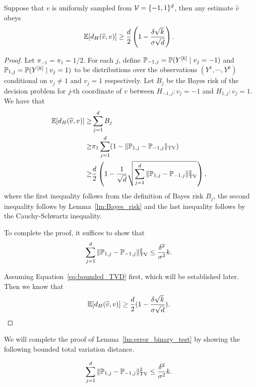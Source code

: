 \begin{lemma}
\label{lm:error_binary_test}
Suppose that $v$ is uniformly sampled from $\mathcal V=\{-1,1\}^d$, then any estimate $\hat{v}$
obeys
\begin{align*}
    \operatorname*{\mathbb{E}}[d_H(\widehat{v},v)]\geq
    \frac{d}{2}\left( 1-\frac{\delta\sqrt{k}}{\sigma\sqrt{d}}\right).
\end{align*}
\end{lemma}

\begin{proof}
Let $\pi_{-1}=\pi_1=1/2$.
For each $j$, define $\mathbb{P}_{-1,j}=\mathbb P(Y^{[k]}\mid v_j=-1)$ and $\mathbb P_{1,j}=\mathbb P(Y^{[k]}\mid v_j=1)$ to be distributions over the observations $(Y^1,\cdots,Y^k)$ conditional on $v_j\neq 1$ and $v_j=1$ respectively.
Let $B_j$ be the Bayes risk of the decision problem for $j$-th coordinate of $v$ between $H_{-1,j}: v_j=-1$ and $H_{1,j}: v_j=1$.
We have that
\begin{align*}
    \operatorname*{\mathbb{E}}[d_H(\widehat{v},v)]
    \geq& \sum_{j=1}^{d}B_j\\
    \geq& \pi_1\sum_{j=1}^{d}(1-\|\mathbb P_{1,j}-\mathbb P_{-1,j}\|_{\mathrm{TV}})\\
    \geq& \frac{d}{2}\left( 1-\frac{1}{\sqrt{d}}\sqrt{\sum_{j=1}^{d}\|\mathbb P_{1,j}-\mathbb P_{-1,j}\|^2_{\mathrm{TV}}}\right),
\end{align*}
where the first inequality follows from the definition of Bayes risk $B_j$, the second inequality follows by Lemma~\ref{lm:Bayes_risk} and the last inequality follows by the Cauchy-Schwartz inequality.

To complete the proof, it suffices to show that
\begin{align}
\label{eq:bounded_TVD}
    \sum_{j=1}^{d}\|\mathbb P_{1,j}-\mathbb P_{-1,j}\|_{\mathrm{TV}}^2\leq \frac{\delta^2}{\sigma^2}k.
\end{align}

Assuming Equation~\eqref{eq:bounded_TVD} first, which will be established later.
Then we know that
\begin{align*}
    \operatorname*{\mathbb{E}}[d_H(\widehat{v},v)]\geq \frac{d}{2}(1-\frac{\delta\sqrt{k}}{\sigma\sqrt{d}}).
\end{align*}
\end{proof}

We will complete the proof of Lemma~\ref{lm:error_binary_test} by showing the following bounded total variation distance.
\begin{claim}
\begin{align*}
    \sum_{j=1}^{d}\|\mathbb P_{1,j}-\mathbb P_{-1,j}\|_{\mathrm{TV}}^2\leq \frac{\delta^2}{\sigma^2}k.
\end{align*}
\end{claim}

